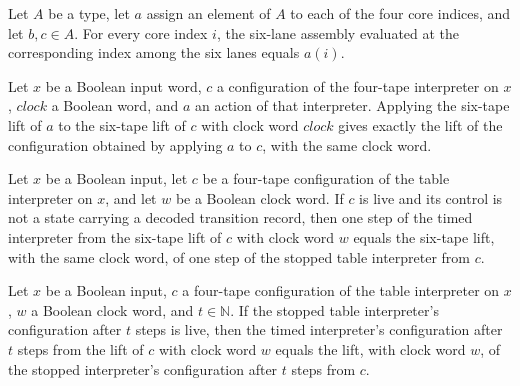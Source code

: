 \begin{lemma}
\label{Turing.timedSix_core}
\leanok
{}
Let $A$ be a type, let $a$ assign an element of $A$ to each of the four core indices,
and let $b,c\in A$. For every core index $i$, the six-lane assembly evaluated at the
corresponding index among the six lanes equals $a(i)$.
\end{lemma}

\begin{lemma}
\label{Turing.timedAction_apply}
\leanok
{}
Let $x$ be a Boolean input word, $c$ a configuration of the four-tape interpreter on
$x$, $clock$ a Boolean word, and $a$ an action of that interpreter. Applying the
six-tape lift of $a$ to the six-tape lift of $c$ with clock word $clock$ gives exactly
the lift of the configuration obtained by applying $a$ to $c$, with the same clock word.
\end{lemma}

\begin{lemma}
\label{Turing.timed_regular_step}
\leanok
{}
Let $x$ be a Boolean input, let $c$ be a four-tape configuration of the table
interpreter on $x$, and let $w$ be a Boolean clock word. If $c$ is live and its control
is not a state carrying a decoded transition record, then one step of the timed
interpreter from the six-tape lift of $c$ with clock word $w$ equals the six-tape lift,
with the same clock word, of one step of the stopped table interpreter from $c$.
\end{lemma}

\begin{lemma}
\label{Turing.timed_replay}
\leanok
{}
Let $x$ be a Boolean input, $c$ a four-tape configuration of the table interpreter on
$x$, $w$ a Boolean clock word, and $t\in\mathbb{N}$. If the stopped table interpreter's
configuration after $t$ steps is live, then the timed interpreter's configuration after
$t$ steps from the lift of $c$ with clock word $w$ equals the lift, with clock word $w$,
of the stopped interpreter's configuration after $t$ steps from $c$.
\end{lemma}

